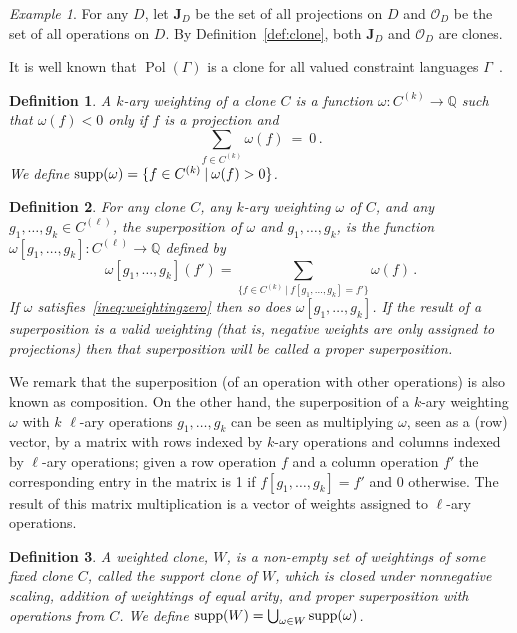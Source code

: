 \documentclass[11pt, reqno]{article}
\DeclareMathOperator{\supp}{{\rm supp}}
\DeclareMathOperator{\pol}{Pol}
\newtheorem{definition}{Definition}
\theoremstyle{remark}
\newtheorem{example}{Example}
\begin{document}
\begin{example}\label{ex:clone}
For any $D$, let $\mathbf{J}_D$ be the set of all projections on $D$ and
$\mathcal{O}_D$ be the set of all operations on $D$. By
Definition~\ref{def:clone}, both $\mathbf{J}_D$ and $\mathcal{O}_D$ are clones.
\end{example}

It is well known that $\pol(\Gamma)$ is a clone for all valued constraint
languages $\Gamma$~\cite{Denecke-Wismath02}.

\begin{definition} \label{defn:wop}
%
A $k$-ary \emph{weighting}
of a clone $C$ is a function $\omega : C^{(k)} \rightarrow \mathbb{Q}$ such that
$\omega(f) < 0$ only if $f$ is a projection and
%
\begin{equation}\label{ineq:weightingzero}
  \sum_{f \in C^{(k)}}\omega(f)\ =\ 0\,.
\end{equation}
%
We define $\supp(\omega)=\{f\in C^{(k)}\:|\:\omega(f)>0\}$.
%
\end{definition}
%
\begin{definition} \label{defn:wp_trans}
%
For any clone $C$, any $k$-ary weighting $\omega$ of $C$, and any $g_1,\ldots,g_k \in
C^{(\ell)}$, the \emph{superposition}
of $\omega$
and $g_1,\ldots,g_k$, is the function $\omega[g_1,\ldots,g_k]: C^{(\ell)}
\rightarrow \mathbb{Q}$ defined by
%
\begin{equation}
\omega[g_1,\ldots,g_k](f') = \sum_{\{f \in C^{(k)}\:|\:f[g_1,\ldots,g_k] =
f'\}}\omega(f)\,.
\end{equation}
%
If $\omega$ satisfies~\eqref{ineq:weightingzero} then so does
$\omega[g_1,\ldots,g_k]$.
If the result of a superposition is a valid weighting (that is, negative weights
are only assigned to projections) then that superposition will be called a
\emph{proper} superposition.
%
\end{definition}
%
We remark that the superposition (of an operation with other operations) is also
known as composition. On the other hand, the superposition of a $k$-ary
weighting $\omega$ with $k$ $\ell$-ary operations $g_1,\ldots,g_k$ can be seen as multiplying $\omega$, seen as
a (row) vector, by a matrix with rows indexed by $k$-ary operations and columns
indexed by $\ell$-ary operations; given a row operation $f$ and a column
operation $f'$ the corresponding entry in the matrix is 1 if
$f[g_1,\ldots,g_k]=f'$ and 0 otherwise. The result of this matrix multiplication is a vector of weights
assigned to $\ell$-ary operations.
%
\begin{definition} \label{defn:wclone}
%
A \emph{weighted clone}, $W$, is a non-empty set of weightings of some fixed
clone $C$, called the \emph{support clone} of $W$, which is closed under nonnegative
scaling, addition of weightings of equal arity, and proper superposition with
operations from $C$. We define $\supp(W)=\bigcup_{\omega\in W}\supp(\omega)$.
%
\end{definition}
\end{document}
